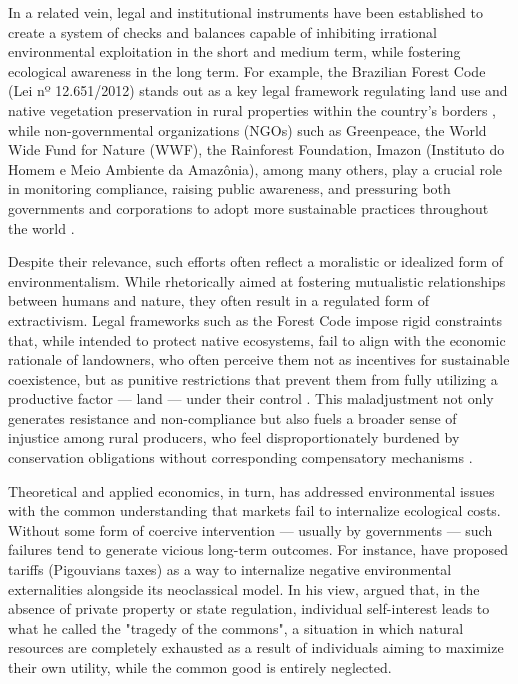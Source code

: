 In a related vein, legal and institutional instruments have been established to create a system of checks and balances capable of inhibiting irrational environmental exploitation in the short and medium term, while fostering ecological awareness in the long term. For example, the Brazilian Forest Code (Lei nº 12.651/2012) stands out as a key legal framework regulating land use and native vegetation preservation in rural properties within the country's borders \cite{brasil2012florestal}, while non-governmental organizations (NGOs) such as Greenpeace, the World Wide Fund for Nature (WWF), the Rainforest Foundation, Imazon (Instituto do Homem e Meio Ambiente da Amazônia), among many others, play a crucial role in monitoring compliance, raising public awareness, and pressuring both governments and corporations to adopt more sustainable practices throughout the world \cite{lomborg2001skeptical}. 

Despite their relevance, such efforts often reflect a moralistic or idealized form of environmentalism. While rhetorically aimed at fostering mutualistic relationships between humans and nature, they often result in a regulated form of extractivism. Legal frameworks such as the Forest Code impose rigid constraints that, while intended to protect native ecosystems, fail to align with the economic rationale of landowners, who often perceive them not as incentives for sustainable coexistence, but as punitive restrictions that prevent them from fully utilizing a productive factor — land — under their control \cite{agrawal2005environmentality}. This maladjustment not only generates resistance and non-compliance but also fuels a broader sense of injustice among rural producers, who feel disproportionately burdened by conservation obligations without corresponding compensatory mechanisms \cite{borner2016mixing}.

Theoretical and applied economics, in turn, has addressed environmental issues with the common understanding that markets fail to internalize ecological costs. Without some form of coercive intervention — usually by governments — such failures tend to generate vicious long-term outcomes. For instance,  have proposed tariffs (Pigouvians taxes) as a way to internalize negative environmental externalities alongside its neoclassical model. In his view,  argued that, in the absence of private property or state regulation, individual self-interest leads to what he called the "tragedy of the commons", a situation in which natural resources are completely exhausted as a result of individuals aiming to maximize their own utility, while the common good is entirely neglected. 

